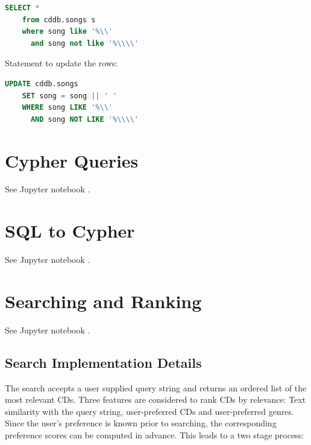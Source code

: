 \documentclass{article}
\begin{document}
\begin{lstlisting}[language=sql]
    SELECT * 
    from cddb.songs s 
    where song like '%\\' 
      and song not like '%\\\\'
\end{lstlisting}

Statement to update the rows:

\begin{lstlisting}[language=sql]
    UPDATE cddb.songs 
    SET song = song || ' ' 
    WHERE song LIKE '%\\' 
      AND song NOT LIKE '%\\\\'
\end{lstlisting}



\section{Cypher Queries}

See Jupyter notebook .

\section{SQL to Cypher}

See Jupyter notebook .

\section{Searching and Ranking}

See Jupyter notebook .

\subsection{Search Implementation Details}

\vspace*{0.1cm}

\noindent
The search accepts a user supplied query string and returns an ordered list of the most relevant CDs. Three features are considered to rank CDs by relevance: Text similarity with the query string, user-preferred CDs and user-preferred genres. Since the user's preference is known prior to searching, the corresponding preference scores can be computed in advance. This leads to a two stage process:
\end{document}
